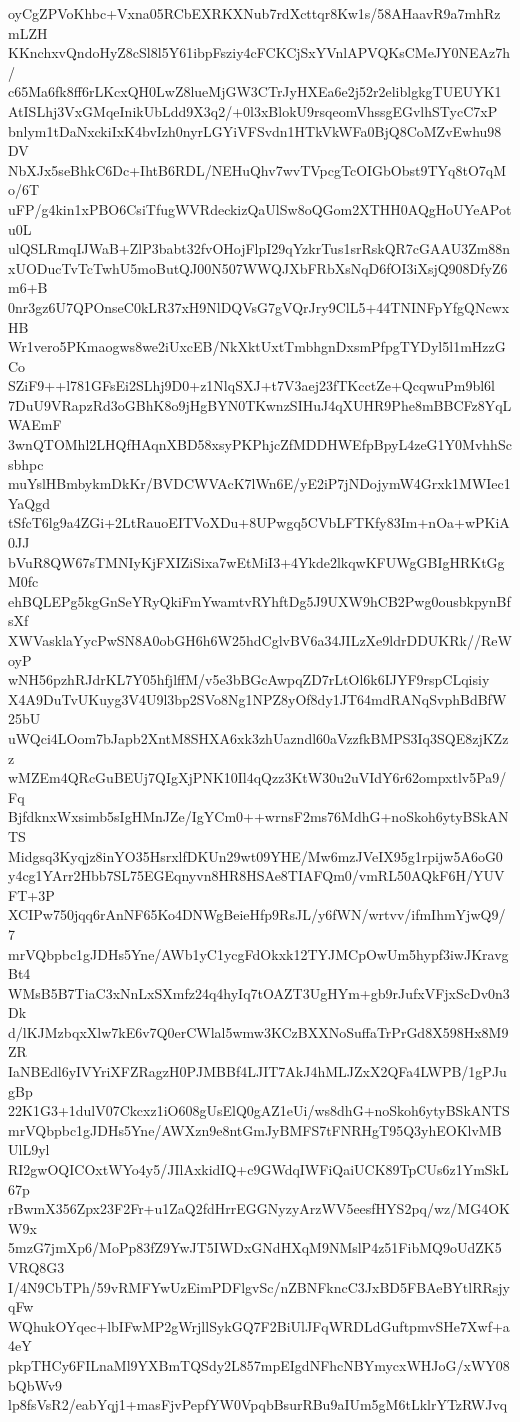 oyCgZPVoKhbc+Vxna05RCbEXRKXNub7rdXcttqr8Kw1s/58AHaavR9a7mhRzmLZH
KKnchxvQndoHyZ8cSl8l5Y61ibpFsziy4cFCKCjSxYVnlAPVQKsCMeJY0NEAz7h/
c65Ma6fk8ff6rLKcxQH0LwZ8lueMjGW3CTrJyHXEa6e2j52r2eliblgkgTUEUYK1
AtISLhj3VxGMqeInikUbLdd9X3q2/+0l3xBlokU9rsqeomVhssgEGvlhSTycC7xP
bnlym1tDaNxckiIxK4bvIzh0nyrLGYiVFSvdn1HTkVkWFa0BjQ8CoMZvEwhu98DV
NbXJx5seBhkC6Dc+IhtB6RDL/NEHuQhv7wvTVpcgTcOIGbObst9TYq8tO7qMo/6T
uFP/g4kin1xPBO6CsiTfugWVRdeckizQaUlSw8oQGom2XTHH0AQgHoUYeAPotu0L
ulQSLRmqIJWaB+ZlP3babt32fvOHojFlpI29qYzkrTus1srRskQR7cGAAU3Zm88n
xUODucTvTcTwhU5moButQJ00N507WWQJXbFRbXsNqD6fOI3iXsjQ908DfyZ6m6+B
0nr3gz6U7QPOnseC0kLR37xH9NlDQVsG7gVQrJry9ClL5+44TNINFpYfgQNcwxHB
Wr1vero5PKmaogws8we2iUxcEB/NkXktUxtTmbhgnDxsmPfpgTYDyl5l1mHzzGCo
SZiF9++l781GFsEi2SLhj9D0+z1NlqSXJ+t7V3aej23fTKcctZe+QcqwuPm9bl6l
7DuU9VRapzRd3oGBhK8o9jHgBYN0TKwnzSIHuJ4qXUHR9Phe8mBBCFz8YqLWAEmF
3wnQTOMhl2LHQfHAqnXBD58xsyPKPhjcZfMDDHWEfpBpyL4zeG1Y0MvhhScsbhpc
muYslHBmbykmDkKr/BVDCWVAcK7lWn6E/yE2iP7jNDojymW4Grxk1MWIec1YaQgd
tSfcT6lg9a4ZGi+2LtRauoEITVoXDu+8UPwgq5CVbLFTKfy83Im+nOa+wPKiA0JJ
bVuR8QW67sTMNIyKjFXIZiSixa7wEtMiI3+4Ykde2lkqwKFUWgGBIgHRKtGgM0fc
ehBQLEPg5kgGnSeYRyQkiFmYwamtvRYhftDg5J9UXW9hCB2Pwg0ousbkpynBfsXf
XWVasklaYycPwSN8A0obGH6h6W25hdCglvBV6a34JILzXe9ldrDDUKRk//ReWoyP
wNH56pzhRJdrKL7Y05hfjlffM/v5e3bBGcAwpqZD7rLtOl6k6IJYF9rspCLqisiy
X4A9DuTvUKuyg3V4U9l3bp2SVo8Ng1NPZ8yOf8dy1JT64mdRANqSvphBdBfW25bU
uWQci4LOom7bJapb2XntM8SHXA6xk3zhUazndl60aVzzfkBMPS3Iq3SQE8zjKZzz
wMZEm4QRcGuBEUj7QIgXjPNK10Il4qQzz3KtW30u2uVIdY6r62ompxtlv5Pa9/Fq
BjfdknxWxsimb5sIgHMnJZe/IgYCm0++wrnsF2ms76MdhG+noSkoh6ytyBSkANTS
Midgsq3Kyqjz8inYO35HsrxlfDKUn29wt09YHE/Mw6mzJVeIX95g1rpijw5A6oG0
y4cg1YArr2Hbb7SL75EGEqnyvn8HR8HSAe8TIAFQm0/vmRL50AQkF6H/YUVFT+3P
XCIPw750jqq6rAnNF65Ko4DNWgBeieHfp9RsJL/y6fWN/wrtvv/ifmIhmYjwQ9/7
mrVQbpbc1gJDHs5Yne/AWb1yC1ycgFdOkxk12TYJMCpOwUm5hypf3iwJKravgBt4
WMsB5B7TiaC3xNnLxSXmfz24q4hyIq7tOAZT3UgHYm+gb9rJufxVFjxScDv0n3Dk
d/lKJMzbqxXlw7kE6v7Q0erCWlal5wmw3KCzBXXNoSuffaTrPrGd8X598Hx8M9ZR
IaNBEdl6yIVYriXFZRagzH0PJMBBf4LJIT7AkJ4hMLJZxX2QFa4LWPB/1gPJugBp
22K1G3+1dulV07Ckcxz1iO608gUsElQ0gAZ1eUi/ws8dhG+noSkoh6ytyBSkANTS
mrVQbpbc1gJDHs5Yne/AWXzn9e8ntGmJyBMFS7tFNRHgT95Q3yhEOKlvMBUlL9yl
RI2gwOQICOxtWYo4y5/JIlAxkidIQ+c9GWdqIWFiQaiUCK89TpCUs6z1YmSkL67p
rBwmX356Zpx23F2Fr+u1ZaQ2fdHrrEGGNyzyArzWV5eesfHYS2pq/wz/MG4OKW9x
5mzG7jmXp6/MoPp83fZ9YwJT5IWDxGNdHXqM9NMslP4z51FibMQ9oUdZK5VRQ8G3
I/4N9CbTPh/59vRMFYwUzEimPDFlgvSc/nZBNFkncC3JxBD5FBAeBYtlRRsjyqFw
WQhukOYqec+lbIFwMP2gWrjllSykGQ7F2BiUlJFqWRDLdGuftpmvSHe7Xwf+a4eY
pkpTHCy6FILnaMl9YXBmTQSdy2L857mpEIgdNFhcNBYmycxWHJoG/xWY08bQbWv9
lp8fsVsR2/eabYqj1+masFjvPepfYW0VpqbBsurRBu9aIUm5gM6tLklrYTzRWJvq

